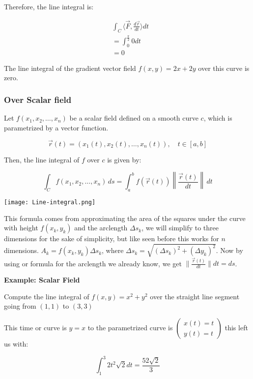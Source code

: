 Therefore, the line integral is:

\begin{align*}
    &\int_C \langle \vec{F}, \frac{d\vec{r}}{dt}\rangle dt \\ 
    &= \int_0^{\frac{\pi}{2}}  0 dt \\
    &= 0
\end{align*}

The line integral of the gradient vector field \(f(x,y) = 2x + 2y \) over this curve is zero. 

\subsubsection{Over Scalar field}

Let \( f(x_1, x_2, \ldots, x_n) \) be a scalar field defined on a smooth curve \(c\), which 
is parametrized by a vector function.

\[
    \vec{r}(t) = (x_1(t), x_2(t), \ldots, x_n(t)), \quad t \in [a, b]
\]

Then, the line integral of \(f\) over \(c\) is given by:

\[
    \int_C f(x_1, x_2, \ldots, x_n) \, ds = \int_a^b f(\vec{r}(t)) \left\| \frac{\vec{r}(t)}{dt} \right\| \, dt
\]

\begin{center}
    \texttt{[image: Line-integral.png]}
\end{center}

This formula comes from approximating the area of the squares under the curve with height \(f(x_k, y_k)\) 
and the arclength \(\varDelta s_k\), we will simplify to three dimensions for the sake
of simplicity, but like seen before this works for \(n\) dimensions. 
\(A_k = f(x_k, y_k) \varDelta s_k\), where 
\(\varDelta s_k = \sqrt{(\varDelta s_k)^2 + (\varDelta y_k)^2} \). Now by using or formula 
for the arclength we already know, we get \(\| \frac{\vec{r}(t)}{dt}\| dt = ds\). 

\textbf{Example: Scalar Field}

Compute the line integral of \(f(x,y) = x^2 + y^2\) over the straight line segment going
from \((1,1)\) to \((3,3)\)

This time or curve is \(y = x\) to the parametrized curve is \(\begin{pmatrix}
    x(t) = t \\ y(t) = t
\end{pmatrix}\) this left us with:

\[
    \int_{1}^{3}  2t^2 \sqrt{2}dt = \frac{52\sqrt{2}}{3} 
\]

